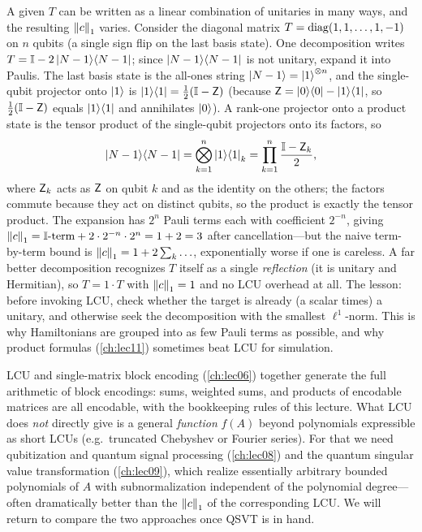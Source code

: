 \begin{example}
\label{exa:lec07-l1decomp}
A given $T$ can be written as a linear combination of unitaries in many ways, and the
resulting $\left\lVert c \right\rVert_1$ varies. Consider the diagonal matrix
$T=\operatorname{diag}(1,1,\dots,1,-1)$ on $n$ qubits (a single sign flip on the last basis
state). One decomposition writes $T=\mathbb{I}-2\ket{N-1}\!\bra{N-1}$; since $\ket{N-1}\!\bra{N-1}$ is not
unitary, expand it into Paulis. The last basis state is the all-ones string
$\ket{N-1}=\ket1^{\otimes n}$, and the single-qubit projector onto $\ket1$ is
$\ket{1}\!\bra{1}=\tfrac12(\mathbb{I}-\mathsf{Z})$ (because $\mathsf{Z}=\ket{0}\!\bra{0}-\ket{1}\!\bra{1}$, so
$\tfrac12(\mathbb{I}-\mathsf{Z})$ equals $\ket{1}\!\bra{1}$ and annihilates $\ket0$). A rank-one projector
onto a product state is the tensor product of the single-qubit projectors onto its
factors, so
\[
  \ket{N-1}\!\bra{N-1}=\bigotimes_{k=1}^{n}\ket{1}\!\bra{1}_k
  =\prod_{k=1}^{n}\frac{\mathbb{I}-\mathsf{Z}_k}{2},
\]
where $\mathsf{Z}_k$ acts as $\mathsf{Z}$ on qubit $k$ and as the identity on the others; the
factors commute because they act on distinct qubits, so the product is exactly the
tensor product. The expansion
has $2^n$ Pauli terms each with coefficient $2^{-n}$, giving
$\left\lVert c \right\rVert_1=\mathbb{I}\text{-term}+2\cdot2^{-n}\cdot 2^n=1+2=3$ after cancellation---but the
naive term-by-term bound is $\left\lVert c \right\rVert_1=1+2\sum_k\ldots$, exponentially worse if one
is careless. A far better decomposition recognizes $T$ itself as a single
\emph{reflection} (it is unitary and Hermitian), so $T=1\cdot T$ with $\left\lVert c \right\rVert_1=1$
and no LCU overhead at all. The lesson: before invoking LCU, check whether the target
is already (a scalar times) a unitary, and otherwise seek the decomposition with the
smallest $\ell^1$-norm. This is why Hamiltonians are grouped into as few Pauli terms
as possible, and why product formulas (\cref{ch:lec11}) sometimes beat LCU for
simulation.
\end{example}

\begin{remark}
\label{rem:lec07-toolbox}
LCU and single-matrix block encoding (\cref{ch:lec06}) together generate the full
arithmetic of block encodings: sums, weighted sums, and products of encodable
matrices are all encodable, with the bookkeeping rules of this lecture. What LCU does
\emph{not} directly give is a general \emph{function} $f(A)$ beyond polynomials
expressible as short LCUs (e.g.\ truncated Chebyshev or Fourier series). For that we
need qubitization and quantum signal processing (\cref{ch:lec08}) and the quantum
singular value transformation (\cref{ch:lec09}), which realize essentially arbitrary
bounded polynomials of $A$ with subnormalization independent of the polynomial
degree---often dramatically better than the $\left\lVert c \right\rVert_1$ of the corresponding LCU. We
will return to compare the two approaches once QSVT is in hand.
\end{remark}

